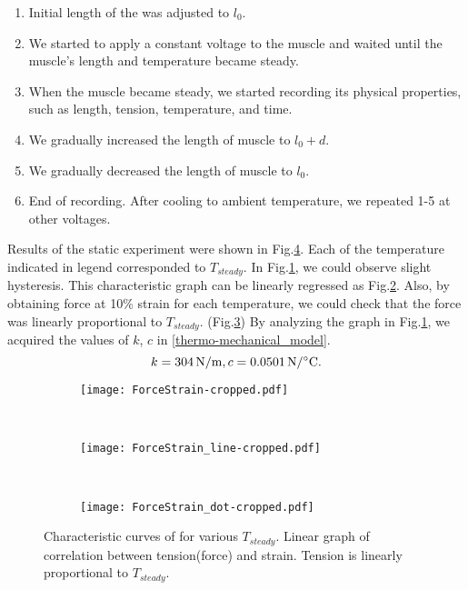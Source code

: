 \begin{enumerate}
\item Initial length of the \scp was adjusted to $l_0$.
\item We started to apply a constant voltage to the muscle and waited until the muscle's length and temperature became steady.
\item When the muscle became steady, we started recording its physical properties, such as length, tension, temperature, and time.
\item We gradually increased the length of muscle to $l_0+d$.
\item We gradually decreased the length of muscle to $l_0$.
\item End of recording. After cooling to ambient temperature, we repeated 1-5 at other voltages.
\end{enumerate}

Results of the static experiment were shown in Fig.\ref{static1_results}. Each of the temperature indicated in legend corresponded to $T_{steady}$. In Fig.\ref{static1_result}, we could observe slight hysteresis. This characteristic graph can be linearly regressed as Fig.\ref{static1_line}. Also, by obtaining force at 10\% strain for each temperature, we could check that the force was linearly proportional to $T_{steady}$. (Fig.\ref{static1_dot}) By analyzing the graph in Fig.\ref{static1_result}, we acquired the values of $k$, $c$ in \eqref{thermo-mechanical_model}.
\begin{equation}
k=\SI{304}{\newton\per\meter}, c=\SI{0.0501}{\newton\per\degreeCelsius}. \notag
\end{equation}

\begin{figure}[t]
	\centering
	\begin{subfigure}[t]{0.32\textwidth}
		\texttt{[image: ForceStrain-cropped.pdf]}
		\caption{\label{static1_result}}
	\end{subfigure}
	~
	\begin{subfigure}[t]{0.32\textwidth}
		\texttt{[image: ForceStrain\_line-cropped.pdf]}
		\caption{\label{static1_line}}
	\end{subfigure}
	~
	\begin{subfigure}[t]{0.32\textwidth}
		\texttt{[image: ForceStrain\_dot-cropped.pdf]}
		\caption{\label{static1_dot}}
	\end{subfigure}
	\caption[Results of the static experiment]{ Characteristic curves of \scp for various $T_{steady}$.  Linear graph of correlation between tension(force) and strain.  Tension is linearly proportional to $T_{steady}$.}
	\label{static1_results}
\end{figure}

